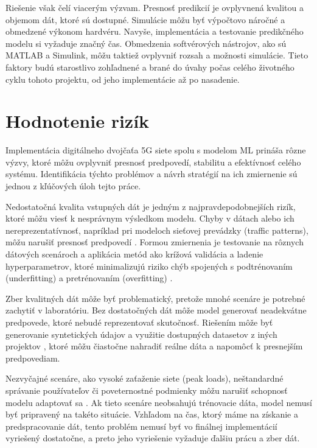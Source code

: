 \par{
Riešenie však čelí viacerým výzvam. Presnosť predikcií je ovplyvnená kvalitou a objemom dát, ktoré sú dostupné. Simulácie môžu byť výpočtovo náročné a obmedzené výkonom hardvéru. Navyše, implementácia a testovanie predikčného modelu si vyžaduje značný čas. Obmedzenia softvérových nástrojov, ako sú MATLAB a Simulink, môžu taktiež ovplyvniť rozsah a možnosti simulácie. Tieto faktory budú starostlivo zohľadnené a brané do úvahy počas celého životného cyklu tohoto projektu, od jeho implementácie až po nasadenie.
}

\section{Hodnotenie rizík}
\par{
Implementácia digitálneho dvojčaťa 5G siete spolu s modelom ML prináša rôzne výzvy, ktoré môžu ovplyvniť presnosť predpovedí, stabilitu a efektívnosť celého systému. Identifikácia týchto problémov a návrh stratégií na ich zmiernenie sú jednou z kľúčových úloh tejto práce.

Nedostatočná kvalita vstupných dát je jedným z najpravdepodobnejších rizík, ktoré môžu viesť k nesprávnym výsledkom modelu. Chyby v dátach alebo ich nereprezentatívnosť, napríklad pri modeloch sieťovej prevádzky (traffic patterns), môžu narušiť presnosť predpovedí \cite{ML_traffic}. Formou zmiernenia je testovanie na rôznych dátových scenároch a aplikácia metód ako krížová validácia a ladenie hyperparametrov, ktoré minimalizujú riziko chýb spojených s podtrénovaním (underfitting) a pretrénovaním (overfitting) \cite{Nguyen}.

Zber kvalitných dát môže byť problematický, pretože mnohé scenáre je potrebné zachytiť v laboratóriu. Bez dostatočných dát môže model generovať neadekvátne predpovede, ktoré nebudé reprezentovať skutočnosť. Riešením môže byť generovanie syntetických údajov \cite{data_generating} a využitie dostupných datasetov z iných projektov \cite{datasets_telecom}, ktoré môžu čiastočne nahradiť reálne dáta a napomôcť k presnejším predpovediam.

Nezvyčajné scenáre, ako vysoké zaťaženie siete (peak loads), neštandardné správanie používateľov či poveternostné podmienky môžu narušiť schopnosť modelu adaptovať sa \cite{challenges_human_factor}. Ak tieto scenáre neobsahujú trénovacie dáta, model nemusí byť pripravený na takéto situácie. Vzhľadom na čas, ktorý máme na získanie a predspracovanie dát, tento problém nemusí byť vo finálnej implementácií vyriešený dostatočne, a preto jeho vyriešenie vyžaduje ďalšiu prácu a zber dát.

}

